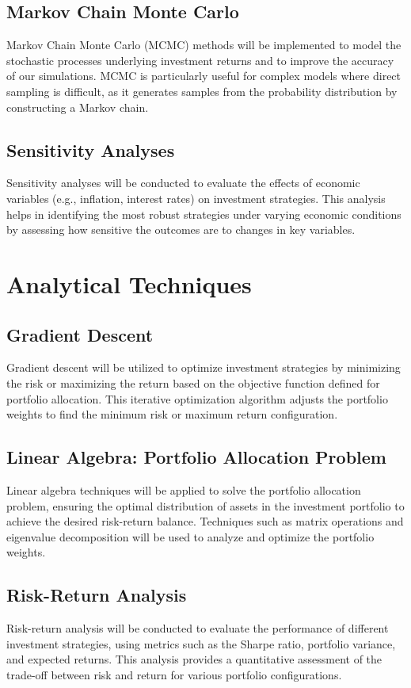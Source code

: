 \documentclass[12pt]{report}
\begin{document}
\subsection{Markov Chain Monte Carlo}
Markov Chain Monte Carlo (MCMC) methods will be implemented to model the stochastic processes underlying investment returns and to improve the accuracy of our simulations. MCMC is particularly useful for complex models where direct sampling is difficult, as it generates samples from the probability distribution by constructing a Markov chain.

\subsection{Sensitivity Analyses}
Sensitivity analyses will be conducted to evaluate the effects of economic variables (e.g., inflation, interest rates) on investment strategies. This analysis helps in identifying the most robust strategies under varying economic conditions by assessing how sensitive the outcomes are to changes in key variables.

\section{Analytical Techniques}
\subsection{Gradient Descent}
Gradient descent will be utilized to optimize investment strategies by minimizing the risk or maximizing the return based on the objective function defined for portfolio allocation. This iterative optimization algorithm adjusts the portfolio weights to find the minimum risk or maximum return configuration.

\subsection{Linear Algebra: Portfolio Allocation Problem}
Linear algebra techniques will be applied to solve the portfolio allocation problem, ensuring the optimal distribution of assets in the investment portfolio to achieve the desired risk-return balance. Techniques such as matrix operations and eigenvalue decomposition will be used to analyze and optimize the portfolio weights.

\subsection{Risk-Return Analysis}
Risk-return analysis will be conducted to evaluate the performance of different investment strategies, using metrics such as the Sharpe ratio, portfolio variance, and expected returns. This analysis provides a quantitative assessment of the trade-off between risk and return for various portfolio configurations.
\end{document}

